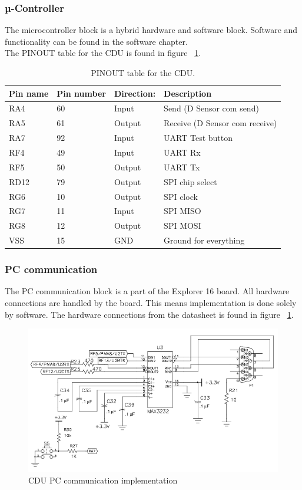 \subsubsection{µ-Controller}
The microcontroller block is a hybrid hardware and software block. Software and functionality can be found in the software chapter.\\
The PINOUT table for the CDU is found in figure ~\ref{fig:PINOUT}.
\begin{table}[H]
	\centering
    \begin{tabular}{|l|l|l|l|}
    \hline
    Pin name & Pin number & Direction: & Description \\ \hline
    RA4    & 60 & Input          & Send (D Sensor com send)            \\ \hline
    RA5    & 61 & Output          & Receive (D Sensor com receive)    \\ \hline
    RA7	   & 92 & Input			 & UART Test button   \\ \hline
    RF4		& 49 & Input		 & UART Rx \\ \hline
    RF5		& 50 & Output		 & UART Tx \\ \hline
    RD12	& 79 & Output			 & SPI chip select           \\ \hline
    RG6		& 10 & Output			 & SPI clock           \\ \hline
    RG7		& 11 & Input			& SPI MISO		\\ \hline
    RG8		& 12 & Output			& SPI MOSI		\\ \hline
    VSS		& 15 & GND				& Ground for everything \\ \hline
    \end{tabular}
    \caption{PINOUT table for the CDU.}
    \label{fig:PINOUT}
\end{table}


\subsubsection{PC communication}
The PC communication block is a part of the Explorer 16 board. All hardware connections are handled by the board. This means implementation is done solely by software. The hardware connections from the datasheet is found in figure ~\ref{fig:CDUimppcc}.
\begin{figure}[H]
	\centering
	\includegraphics[width=1\textwidth]{billeder/imppcc}
	\caption{CDU PC communication implementation}
	\label{fig:CDUimppcc}
\end{figure}

